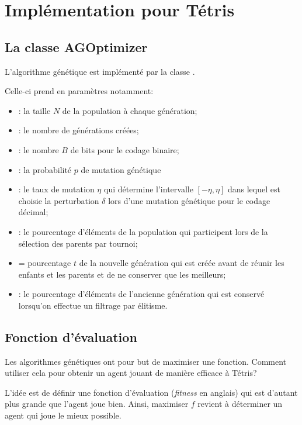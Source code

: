 \chapter{Implémentation pour Tétris}

\section{La classe AGOptimizer}

L'algorithme génétique est implémenté par la classe .

Celle-ci prend en paramètres notamment:
\begin{itemize}
	\item {}: la taille $N$ de la population à chaque génération;
	\item {}: le nombre de générations créées;
	\item {}: le nombre $B$ de bits pour le codage binaire;
	\item {}: la probabilité $p$ de mutation génétique
	\item {}: le taux de mutation $\eta$ qui détermine l'intervalle $[-\eta, \eta]$ dans lequel est choisie la perturbation $\delta$ lors d'une mutation génétique pour le codage décimal;
	\item {}: le pourcentage d'éléments de la population qui participent lors de la sélection des parents par tournoi;
	\item {} = pourcentage $t$ de la nouvelle génération qui est créée avant de réunir les enfants et les parents et de ne conserver que les meilleurs;
	\item {}: le pourcentage d'éléments de l'ancienne génération qui est conservé lorsqu'on effectue un filtrage par élitisme.
\end{itemize}

\section{Fonction d'évaluation}
Les algorithmes génétiques ont pour but de maximiser une fonction. Comment utiliser cela pour obtenir un agent jouant de manière efficace à Tétris?

L'idée est de définir une fonction d'évaluation (\textit{fitness} en anglais) qui est d'autant plus grande que l'agent joue bien. Ainsi, maximiser $f$ revient à déterminer un agent qui joue le mieux possible.\\

